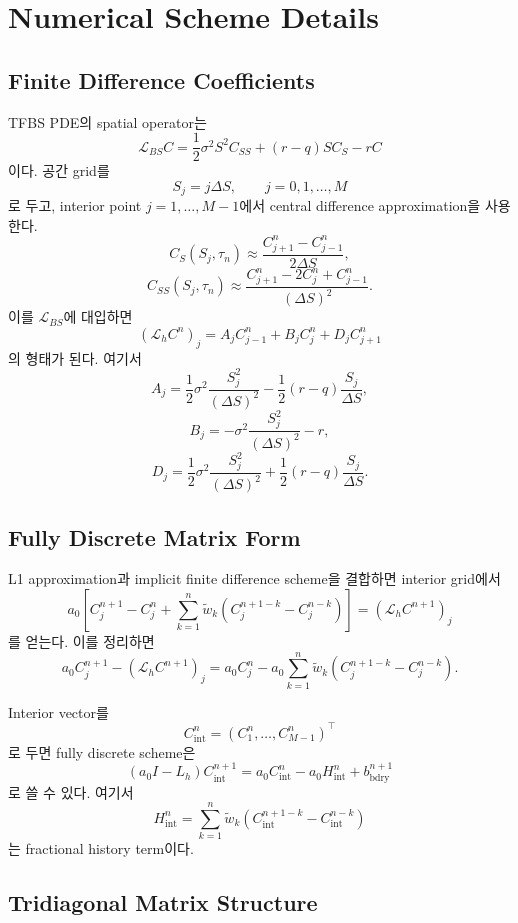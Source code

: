 \documentclass[11pt,a4paper]{report}
\begin{document}
\chapter{Numerical Scheme Details}

\section{Finite Difference Coefficients}

TFBS PDE의 spatial operator는
\[
\mathcal{L}_{BS}C
=
\frac{1}{2}\sigma^2S^2C_{SS}
+
(r-q)SC_S
-
rC
\]
이다. 공간 grid를
\[
S_j=j\Delta S,
\qquad j=0,1,\dots,M
\]
로 두고, interior point $j=1,\dots,M-1$에서 central difference approximation을 사용한다.
\[
C_S(S_j,\tau_n)
\approx
\frac{C_{j+1}^n-C_{j-1}^n}{2\Delta S},
\]
\[
C_{SS}(S_j,\tau_n)
\approx
\frac{C_{j+1}^n-2C_j^n+C_{j-1}^n}{(\Delta S)^2}.
\]
이를 $\mathcal{L}_{BS}$에 대입하면
\[
(\mathcal{L}_hC^n)_j
=
A_jC_{j-1}^n
+
B_jC_j^n
+
D_jC_{j+1}^n
\]
의 형태가 된다. 여기서
\[
A_j
=
\frac{1}{2}\sigma^2\frac{S_j^2}{(\Delta S)^2}
-
\frac{1}{2}(r-q)\frac{S_j}{\Delta S},
\]
\[
B_j
=
-\sigma^2\frac{S_j^2}{(\Delta S)^2}
-
r,
\]
\[
D_j
=
\frac{1}{2}\sigma^2\frac{S_j^2}{(\Delta S)^2}
+
\frac{1}{2}(r-q)\frac{S_j}{\Delta S}.
\]

\section{Fully Discrete Matrix Form}

L1 approximation과 implicit finite difference scheme을 결합하면 interior grid에서
\[
a_0
\left[
C_j^{n+1}-C_j^n
+
\sum_{k=1}^{n}
\widetilde w_k
\left(
C_j^{n+1-k}-C_j^{n-k}
\right)
\right]
=
(\mathcal{L}_hC^{n+1})_j
\]
를 얻는다. 이를 정리하면
\[
a_0C_j^{n+1}
-
(\mathcal{L}_hC^{n+1})_j
=
a_0C_j^n
-
a_0
\sum_{k=1}^{n}
\widetilde w_k
\left(
C_j^{n+1-k}-C_j^{n-k}
\right).
\]

Interior vector를
\[
C_{\mathrm{int}}^n
=
(C_1^n,\dots,C_{M-1}^n)^\top
\]
로 두면 fully discrete scheme은
\[
(a_0I-L_h)C_{\mathrm{int}}^{n+1}
=
a_0C_{\mathrm{int}}^n
-
a_0H_{\mathrm{int}}^n
+
b_{\mathrm{bdry}}^{n+1}
\]
로 쓸 수 있다. 여기서
\[
H_{\mathrm{int}}^n
=
\sum_{k=1}^{n}
\widetilde w_k
\left(
C_{\mathrm{int}}^{n+1-k}
-
C_{\mathrm{int}}^{n-k}
\right)
\]
는 fractional history term이다.

\section{Tridiagonal Matrix Structure}
\end{document}
